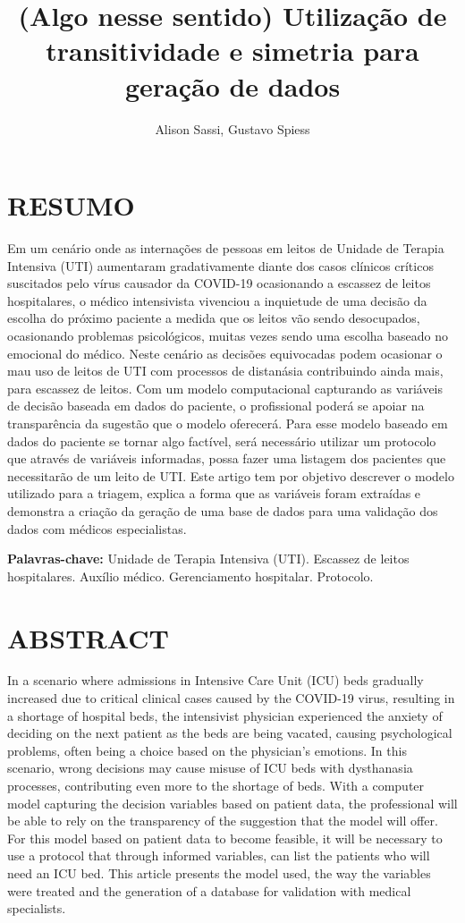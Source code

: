 \documentclass[12pt]{article}
\title{(Algo nesse sentido) Utilização de transitividade e simetria para geração de dados}
\author{Alison Sassi\inst{1}, Gustavo Spiess\inst{2} }
\begin{document}
 

\maketitle

\section{RESUMO} 
Em um cenário onde as internações de pessoas em leitos de Unidade de Terapia Intensiva (UTI) aumentaram gradativamente diante dos casos clínicos críticos suscitados pelo vírus causador da COVID-19 ocasionando a escassez de leitos hospitalares, o médico intensivista vivenciou a inquietude de uma decisão da escolha do próximo paciente a medida que os leitos vão sendo desocupados, ocasionando problemas psicológicos, muitas vezes sendo uma escolha baseado no emocional do médico. Neste cenário as decisões equivocadas podem ocasionar o mau uso de leitos de UTI com processos de distanásia contribuindo  ainda mais, para escassez de leitos. Com um modelo computacional capturando as variáveis de decisão baseada em dados do paciente, o profissional poderá se apoiar na transparência da sugestão que o modelo oferecerá. Para esse modelo baseado em dados do paciente se tornar algo factível, será necessário utilizar um protocolo que através de variáveis informadas, possa fazer uma listagem dos pacientes que necessitarão de um leito de UTI. Este artigo tem por objetivo descrever o modelo utilizado para a triagem, explica a forma que as variáveis foram extraídas e demonstra a criação da geração de uma base de dados para uma validação dos dados com médicos especialistas.

\textbf{Palavras-chave:} Unidade de Terapia Intensiva (UTI). Escassez de leitos hospitalares. Auxílio médico. Gerenciamento hospitalar. Protocolo.

\section{ABSTRACT} 
In a scenario where admissions in Intensive Care Unit (ICU) beds gradually increased due to critical clinical cases caused by the COVID-19 virus, resulting in a shortage of hospital beds, the intensivist physician experienced the anxiety of deciding on the next patient as the beds are being vacated, causing psychological problems, often being a choice based on the physician's emotions. In this scenario, wrong decisions may cause misuse of ICU beds with dysthanasia processes, contributing even more to the shortage of beds. With a computer model capturing the decision variables based on patient data, the professional will be able to rely on the transparency of the suggestion that the model will offer. For this model based on patient data to become feasible, it will be necessary to use a protocol that through informed variables, can list the patients who will need an ICU bed. This article presents the model used, the way the variables were treated and the generation of a database for validation with medical specialists.
\end{document}
